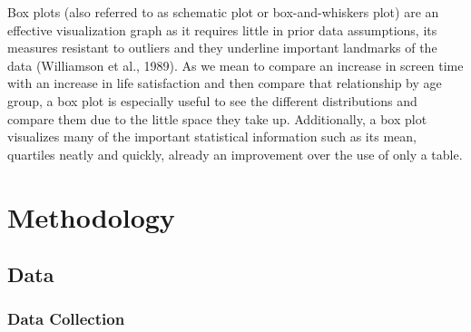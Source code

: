 \documentclass[12pt, a4paper]{article}
\begin{document}
\newpage
\par Box plots (also referred to as schematic plot or box-and-whiskers plot) are an effective visualization graph as it requires little in prior data assumptions, its measures resistant to outliers and they underline important landmarks of the data (Williamson et al., 1989). As we mean to compare an increase in screen time with an increase in life satisfaction and then compare that relationship by age group, a box plot is especially useful to see the different distributions and compare them due to the little space they take up. Additionally, a box plot visualizes many of the important statistical information such as its mean, quartiles neatly and quickly, already an improvement over the use of only a table.

\section{Methodology}

\subsection{Data}
\subsubsection{Data Collection}
\end{document}

